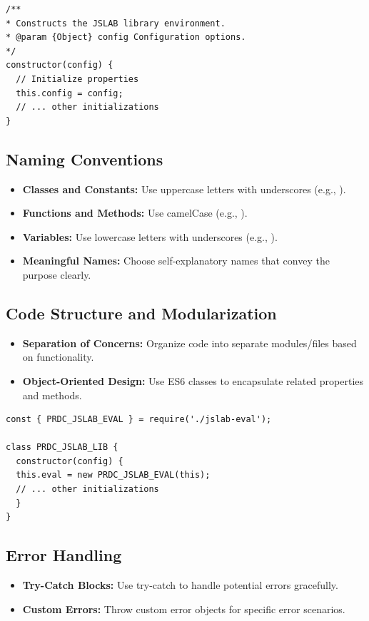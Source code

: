 \documentclass[12pt,a4paper]{article}
\begin{document}
\begin{lstlisting}[style=JavaScriptStyle]
/**
* Constructs the JSLAB library environment.
* @param {Object} config Configuration options.
*/
constructor(config) {
  // Initialize properties
  this.config = config;
  // ... other initializations
}
\end{lstlisting}

\subsection{Naming Conventions}
\begin{itemize}
  \item \textbf{Classes and Constants:} Use uppercase letters with underscores (e.g., ).

  \item \textbf{Functions and Methods:} Use camelCase (e.g., ).

  \item \textbf{Variables:} Use lowercase letters with underscores (e.g., ).

  \item \textbf{Meaningful Names:} Choose self-explanatory names that convey the purpose clearly.
\end{itemize}

\subsection{Code Structure and Modularization}
\begin{itemize}
  \item \textbf{Separation of Concerns:} Organize code into separate modules/files based on functionality.

  \item \textbf{Object-Oriented Design:} Use ES6 classes to encapsulate related properties and methods.
\end{itemize}

\begin{lstlisting}[style=JavaScriptStyle]
const { PRDC_JSLAB_EVAL } = require('./jslab-eval');

class PRDC_JSLAB_LIB {
  constructor(config) {
  this.eval = new PRDC_JSLAB_EVAL(this);
  // ... other initializations
  }
}
\end{lstlisting}

\subsection{Error Handling}
\begin{itemize}
  \item \textbf{Try-Catch Blocks:} Use try-catch to handle potential errors gracefully.

  \item \textbf{Custom Errors:} Throw custom error objects for specific error scenarios.
\end{itemize}
\end{document}
